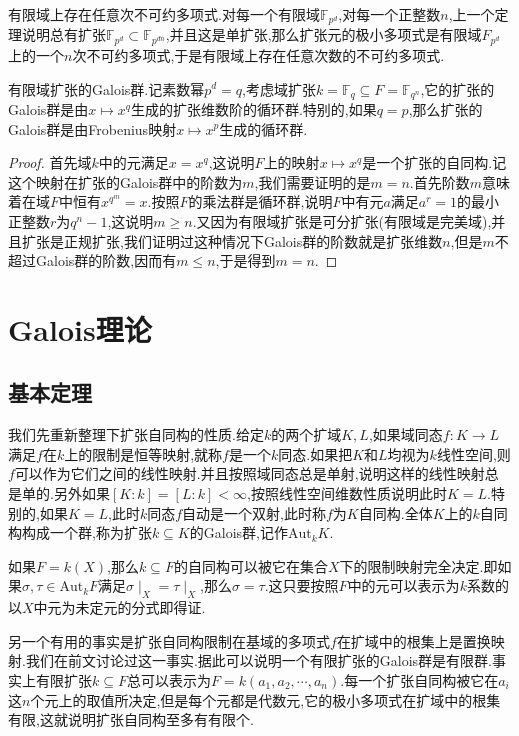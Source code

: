 有限域上存在任意次不可约多项式.对每一个有限域$\mathbb{F}_{p^d}$,对每一个正整数$n$,上一个定理说明总有扩张$\mathbb{F}_{p^d}\subset\mathbb{F}_{p^{dn}}$,并且这是单扩张,那么扩张元的极小多项式是有限域$F_{p^d}$上的一个$n$次不可约多项式,于是有限域上存在任意次数的不可约多项式.

有限域扩张的Galois群.记素数幂$p^d=q$,考虑域扩张$k=\mathbb{F}_{q}\subseteq F=\mathbb{F}_{q^n}$,它的扩张的Galois群是由$x\mapsto x^q$生成的扩张维数阶的循环群.特别的,如果$q=p$,那么扩张的Galois群是由Frobenius映射$x\mapsto x^p$生成的循环群.
\begin{proof}

首先域$k$中的元满足$x=x^q$,这说明$F$上的映射$x\mapsto x^q$是一个扩张的自同构.记这个映射在扩张的Galois群中的阶数为$m$,我们需要证明的是$m=n$.首先阶数$m$意味着在域$F$中恒有$x^{q^m}=x$.按照$F$的乘法群是循环群,说明$F$中有元$a$满足$a^r=1$的最小正整数$r$为$q^n-1$,这说明$m\ge n$.又因为有限域扩张是可分扩张(有限域是完美域),并且扩张是正规扩张,我们证明过这种情况下Galois群的阶数就是扩张维数$n$,但是$m$不超过Galois群的阶数,因而有$m\le n$,于是得到$m=n$.
\end{proof}
\newpage
\section{Galois理论}
\subsection{基本定理}

我们先重新整理下扩张自同构的性质.给定$k$的两个扩域$K,L$,如果域同态$f:K\to L$满足$f$在$k$上的限制是恒等映射,就称$f$是一个$k$同态.如果把$K$和$L$均视为$k$线性空间,则$f$可以作为它们之间的线性映射.并且按照域同态总是单射,说明这样的线性映射总是单的.另外如果$[K:k]=[L:k]<\infty$,按照线性空间维数性质说明此时$K=L$.特别的,如果$K=L$,此时$k$同态$f$自动是一个双射,此时称$f$为$K$自同构.全体$K$上的$k$自同构构成一个群,称为扩张$k\subseteq K$的Galois群,记作$\mathrm{Aut}_kK$.

如果$F=k(X)$,那么$k\subseteq F$的自同构可以被它在集合$X$下的限制映射完全决定.即如果$\sigma,\tau\in\mathrm{Aut}_kF$满足$\sigma\mid_X=\tau\mid_X$,那么$\sigma=\tau$.这只要按照$F$中的元可以表示为$k$系数的以$X$中元为未定元的分式即得证.

另一个有用的事实是扩张自同构限制在基域的多项式$f$在扩域中的根集上是置换映射.我们在前文讨论过这一事实.据此可以说明一个有限扩张的Galois群是有限群.事实上有限扩张$k\subseteq F$总可以表示为$F=k(a_1,a_2,\cdots,a_n)$.每一个扩张自同构被它在$a_i$这$n$个元上的取值所决定,但是每个元都是代数元,它的极小多项式在扩域中的根集有限,这就说明扩张自同构至多有有限个.

